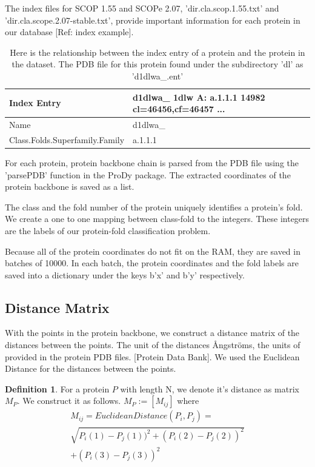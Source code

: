 \documentclass[12pt, a4paper, twocolumn, fullpage]{article}
\theoremstyle{plain}
\theoremstyle{definition}
\newtheorem{defn}{Definition}[section]
\theoremstyle{remark}
\begin{document}
The index files for SCOP 1.55 and SCOPe 2.07, 'dir.cla.scop.1.55.txt' and 'dir.cla.scope.2.07-stable.txt', provide important information for each protein in our database [Ref: index example]. 

\begin{table}[h]
    \centering
    \begin{tabular}{| l | l|}
        \hline 
        Index Entry & d1dlwa\_ 1dlw    A:  a.1.1.1 14982	cl=46456,cf=46457 ... \\ \hline
        Name & d1dlwa\_     \\ \hline
        Class.Folds.Superfamily.Family & a.1.1.1    \\ \hline
    \end{tabular}
    \caption{ Here is the relationship between the index entry of a protein and the protein in the dataset. The PDB file for this protein found under the subdirectory 'dl' as 'd1dlwa\_.ent'}
    \label{tbl:Index Entry}
\end{table}

For each protein, protein backbone chain is parsed from the PDB file using the 'parsePDB' function in the ProDy package. The extracted coordinates of the protein backbone is saved as a list. 

The class and the fold number of the protein uniquely identifies a protein's fold. We create a one to one mapping between class-fold to the integers. These integers are the labels of our protein-fold classification problem.

Because all of the protein coordinates do not fit on the RAM, they are saved in batches of 10000. In each batch, the protein coordinates and the fold labels are saved into a dictionary under the keys b'x' and b'y' respectively.

\subsection{ Distance Matrix}
With the points in the protein backbone, we construct a distance matrix of the distances between the points. The unit of the distances Ångströms, the units of provided in the protein PDB files. [Protein Data Bank]. We used the Euclidean Distance for the distances between the points.

    
\begin{defn}
    For a protein $P$ with length N, we denote it's distance as matrix $M_{P}$.
    We construct it as follows.
    $ M_{P} := [M_{ij}] $ where 
    \begin{multline*}
    M_{ij} = Euclidean Distance(P_i, P_j) = \\ \sqrt{P_i(1)-P_j(1))^2+(P_i(2)-P_j(2))^2} \\ +(P_i(3)-P_j(3))^2
    \end{multline*}
\end{defn}
\end{document}
